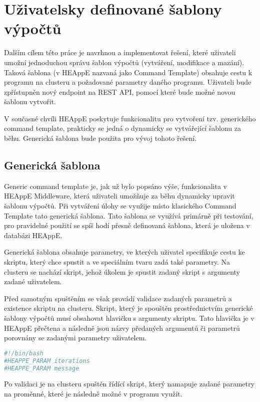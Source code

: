 \chapter{Uživatelsky definované šablony výpočtů}
Dalším cílem této práce je navrhnou a implementovat řešení, které uživateli umožní jednoduchou správu šablon výpočtů (vytváření, modifikace a mazání). Taková šablona (v HEAppE nazvaná jako Command Template) obsahuje cestu k programu na clusteru a požadované parametry daného programu. Uživateli bude zpřístupněn nový endpoint na REST API, pomocí které bude možné novou šablonu vytvořit.

V současné chvíli HEAppE poskytuje funkcionalitu pro vytvoření tzv. generického command template, prakticky se jedná o dynamicky se vytvářející šablonu za běhu. Generická šablona bude použita pro vývoj tohoto řešení.

\section{Generická šablona}
Generic command template je, jak už bylo popsáno výše, funkcionalita v HEAppE Middleware, která uživateli umožňuje za běhu dynamicky upravit šablonu výpočtů. Při vytváření úlohy se využije místo klasického Command Template tato generická šablona. Tato šablona se využívá primárně při testování, pro pravidelné použití se spíš hodí přesně definovaná šablona, která je uložena v databázi HEAppE. 

Generická šablona obsahuje parametry, ve kterých uživatel specifikuje cestu ke skriptu, který chce spustit a ve speciálním tvaru zadá také parametry. Na clusteru se nachází skript, jehož úkolem je spustit zadaný skript s argumenty zadané uživatelem.

Před samotným spuštěním se však provádí validace zadaných parametrů a existence skriptu na clusteru. Skript, který je spouštěn prostřednictvím generické šablony výpočtů musí obsahovat hlavičku s argumenty skriptu. Tato hlavička je v HEAppE přečtena a následně jsou názvy předaných argumentů či parametrů porovnány se zadanými parametry uživatelem.

\newpage
\begin{lstlisting}[language=bash,caption={Ukázková hlavička skriptu s „generickými" parametry iterations a message}]
#!/bin/bash
#HEAPPE_PARAM iterations
#HEAPPE_PARAM message
\end{lstlisting}

Po validaci je na clusteru spuštěn řídící skript, který namapuje zadané parametry na proměnné, které je následně možné v programu využít.

